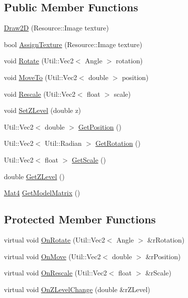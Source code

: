 \subsection*{Public Member Functions}
\begin{DoxyCompactItemize}
\item 
\hyperlink{class_tri_1_1_graphic_1_1_draw2_d_a7a4fcef9fa0faa8e25ece699d28785c6}{Draw2\+D} (Resource\+::\+Image texture)
\item 
bool \hyperlink{class_tri_1_1_graphic_1_1_draw2_d_ade0b5fadee0bbfd97bbf1619cb16c6ea}{Assign\+Texture} (Resource\+::\+Image texture)
\item 
void \hyperlink{class_tri_1_1_graphic_1_1_draw2_d_ad0a6811ffd761114919f01b4dfcdc0d7}{Rotate} (Util\+::\+Vec2$<$ Angle $>$ rotation)
\item 
void \hyperlink{class_tri_1_1_graphic_1_1_draw2_d_a02434f6c9d46a00009afa18e9a2599f6}{Move\+To} (Util\+::\+Vec2$<$ double $>$ position)
\item 
void \hyperlink{class_tri_1_1_graphic_1_1_draw2_d_ae446a7a0c520d9cf2f358d63ead9e50f}{Rescale} (Util\+::\+Vec2$<$ float $>$ scale)
\item 
void \hyperlink{class_tri_1_1_graphic_1_1_draw2_d_aef4e47c193df3832c46a446745aeec0a}{Set\+Z\+Level} (double z)
\item 
Util\+::\+Vec2$<$ double $>$ \hyperlink{class_tri_1_1_graphic_1_1_draw2_d_a3e5faa6322d8f0743bd13efdd83ad4a9}{Get\+Position} ()
\item 
Util\+::\+Vec2$<$ Util\+::\+Radian $>$ \hyperlink{class_tri_1_1_graphic_1_1_draw2_d_a9b234a4abe1716e06dcbf1eea330dc3d}{Get\+Rotation} ()
\item 
Util\+::\+Vec2$<$ float $>$ \hyperlink{class_tri_1_1_graphic_1_1_draw2_d_a633dbe8143a7fcb6981be2447d782490}{Get\+Scale} ()
\item 
double \hyperlink{class_tri_1_1_graphic_1_1_draw2_d_a314b4296587449bda1f1bfe443909581}{Get\+Z\+Level} ()
\item 
\hyperlink{namespace_tri_1_1_graphic_a7b3538cdaff9bf96489c56a4f48a5f9a}{Mat4} \hyperlink{class_tri_1_1_graphic_1_1_draw2_d_ab9fda1624fd99c6ab7d05e8a9aa2b4bd}{Get\+Model\+Matrix} ()
\end{DoxyCompactItemize}
\subsection*{Protected Member Functions}
\begin{DoxyCompactItemize}
\item 
virtual void \hyperlink{class_tri_1_1_graphic_1_1_draw2_d_ab291c401ee1ec4d505665e8b2c1d21cc}{On\+Rotate} (Util\+::\+Vec2$<$ Angle $>$ \&r\+Rotation)
\item 
virtual void \hyperlink{class_tri_1_1_graphic_1_1_draw2_d_ab9b725d76f67e0edfb920ba5b44cf8d3}{On\+Move} (Util\+::\+Vec2$<$ double $>$ \&r\+Position)
\item 
virtual void \hyperlink{class_tri_1_1_graphic_1_1_draw2_d_a7494de2373e773b7380ddb66b1edafe8}{On\+Rescale} (Util\+::\+Vec2$<$ float $>$ \&r\+Scale)
\item 
virtual void \hyperlink{class_tri_1_1_graphic_1_1_draw2_d_a31a8a3b099dfe0ad23f4d7378846a731}{On\+Z\+Level\+Change} (double \&r\+Z\+Level)
\end{DoxyCompactItemize}
